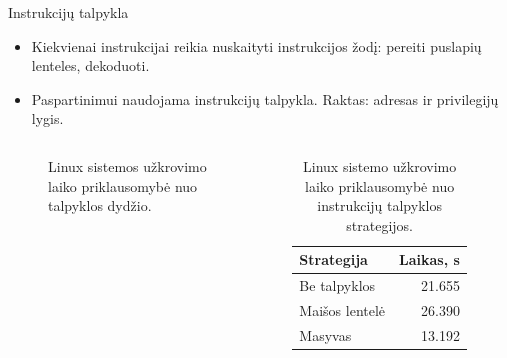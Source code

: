 \documentclass[aspectratio=169]{beamer}
\begin{document}
\begin{frame}{Instrukcijų talpykla}
    \begin{itemize}
        \item Kiekvienai instrukcijai reikia nuskaityti instrukcijos žodį: pereiti puslapių lenteles, dekoduoti. 
        \item Paspartinimui naudojama instrukcijų talpykla. Raktas: adresas ir privilegijų lygis.
    \end{itemize}
    \pause


    \begin{columns}[T]
        \begin{figure}[h]
            \centering
            
            \caption{Linux sistemos užkrovimo laiko priklausomybė nuo talpyklos dydžio.}
        \end{figure}
        \begin{table}
            \small
            \centering
            \begin{tabular}{lr}
                \toprule
                Strategija & Laikas, s \\
                \midrule
                Be talpyklos & 21.655 \\
                Maišos lentelė & 26.390 \\
                Masyvas & 13.192 \\
                \bottomrule
            \end{tabular}
            \caption{Linux sistemo užkrovimo laiko priklausomybė nuo instrukcijų talpyklos strategijos.}
        \end{table}
    \end{columns}
\end{frame}
\end{document}
